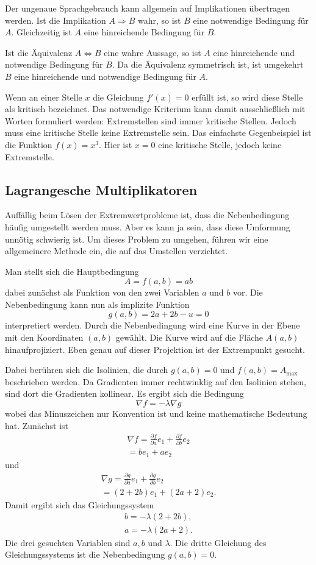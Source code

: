 \documentclass[a4paper,11pt,fleqn,twocolumn,twoside,dvipdfmx]{scrartcl}
\begin{document}
Der ungenaue Sprachgebrauch kann allgemein auf Implikationen
übertragen werden. Ist die Implikation
$A\Rightarrow B$
wahr, so ist $B$ eine notwendige Bedingung für $A$.
Gleichzeitig ist $A$ eine hinreichende Bedingung für $B$.

Ist die Äquivalenz $A\Leftrightarrow B$ eine wahre Aussage, so ist
$A$ eine hinreichende und notwendige Bedingung für $B$. Da die
Äquivalenz symmetrisch ist, ist umgekehrt $B$ eine hinreichende
und notwendige Bedingung für $A$.

Wenn an einer Stelle $x$ die Gleichung $f'(x)=0$ erfüllt ist,
so wird diese Stelle als kritisch bezeichnet. Das notwendige
Kriterium kann damit ausschließlich mit Worten formuliert werden:
Extremstellen sind immer kritische Stellen. Jedoch muss eine kritische
Stelle keine Extremstelle sein. Das einfachste Gegenbeispiel ist
die Funktion $f(x)=x^3$. Hier ist $x=0$ eine kritische Stelle,
jedoch keine Extremstelle.

\subsection*{Lagrangesche Multiplikatoren}

Auffällig beim Lösen der Extremwertprobleme ist, dass die
Nebenbedingung häufig umgestellt werden muss. Aber es kann ja sein,
dass diese Umformung unnötig schwierig ist. Um dieses Problem zu
umgehen, führen wir eine allgemeinere Methode ein, die auf das
Umstellen verzichtet.

Man stellt sich die
Hauptbedingung
\[A=f(a,b)=ab\]
dabei zunächst als Funktion von den zwei
Variablen $a$ und $b$ vor. Die Nebenbedingung kann nun als
implizite Funktion
\[g(a,b)=2a+2b-u=0\]
interpretiert werden. Durch die
Nebenbedingung wird eine Kurve in der Ebene mit den Koordinaten
$(a,b)$ gewählt. Die Kurve wird auf die Fläche $A(a,b)$
hinaufprojiziert. Eben genau auf dieser Projektion ist der
Extrempunkt gesucht.

Dabei berühren sich die Isolinien, die durch $g(a,b)=0$ und
$f(a,b)=A_\mathrm{max}$ beschrieben werden. Da Gradienten immer
rechtwinklig auf den Isolinien stehen, sind dort die Gradienten
kollinear. Es ergibt sich die Bedingung
\[\nabla f = -\lambda\nabla g\]
wobei das Minuszeichen nur Konvention ist und keine mathematische
Bedeutung hat. Zunächst ist
\begin{gather*}
\nabla f = \frac{\partial f}{\partial a}e_1
+\frac{\partial f}{\partial b}e_2\\
= be_1+ae_2
\end{gather*}
und
\begin{gather*}
\nabla g = \frac{\partial g}{\partial a}e_1
+\frac{\partial g}{\partial b}e_2\\
= (2+2b)e_1+(2a+2)e_2.
\end{gather*}
Damit ergibt sich das Gleichungssystem
\begin{gather*}
b=-\lambda (2+2b),\\
a=-\lambda (2a+2).
\end{gather*}
Die drei gesuchten Variablen sind $a,b$ und $\lambda$.
Die dritte Gleichung des Gleichungssystems ist die Nebenbedingung
$g(a,b)=0$.
\end{document}
